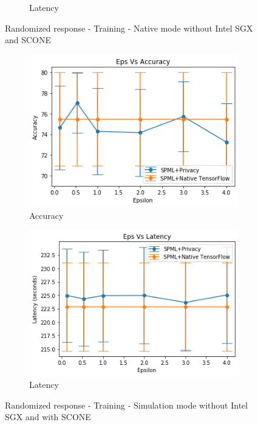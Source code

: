 \begin{figure}
\begin{subfigure}{0.5\textwidth}
         \caption{Latency}
         \label{fig:nativeRRLatencyTraining}
     \end{subfigure}
        \caption{Randomized response - Training - Native mode without Intel SGX and SCONE}
     \begin{subfigure}{0.5\textwidth}
         \includegraphics[width=\textwidth]{images/Training/RRSIMAccuracy.png}
         \caption{Accuracy}
         \label{fig:simRRAccuracyTraining}
     \end{subfigure}
     \begin{subfigure}{0.5\textwidth}
         \includegraphics[width=\textwidth]{images/Training/RRSIMLatency.png}
         \caption{Latency}
         \label{fig:simRRLatencyTraining}
     \end{subfigure}
        \caption{Randomized response - Training - Simulation mode without Intel SGX and with SCONE}

\end{figure}

